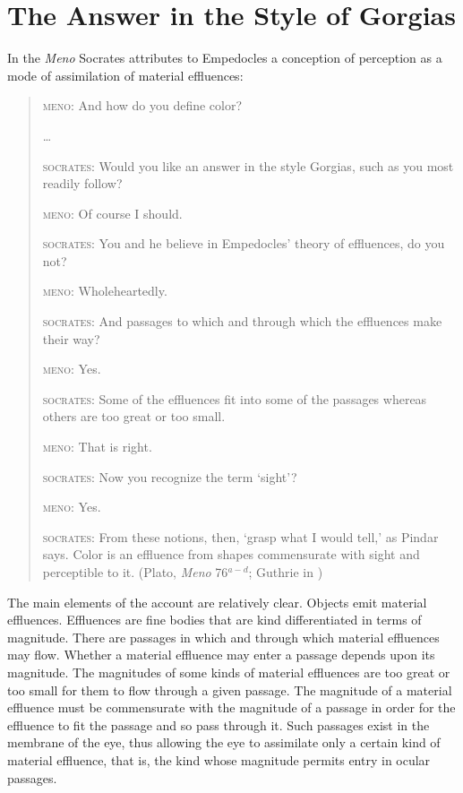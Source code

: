 \section{The Answer in the Style of Gorgias} %
\label{sec:the_answer_in_the_style_of_gorgias}

In the \emph{Meno} Socrates attributes to Empedocles a conception of perception as a mode of assimilation of material effluences:
\begin{quotation}
    \textsc{meno}: And how do you define color?
    
    \ldots
    
    \textsc{socrates}: Would you like an answer in the style Gorgias, such as you most readily follow?
    
    \textsc{meno}: Of course I should.
    
    \textsc{socrates}: You and he believe in Empedocles' theory of effluences, do you not?
    
    \textsc{meno}: Wholeheartedly.
    
    \textsc{socrates}: And passages to which and through which the effluences make their way?
    
    \textsc{meno}: Yes.
    
    \textsc{socrates}: Some of the effluences fit into some of the passages whereas others are too great or too small.
    
    \textsc{meno}: That is right.
    
    \textsc{socrates}: Now you recognize the term `sight'?
    
    \textsc{meno}: Yes.
    
    \textsc{socrates}: From these notions, then, `grasp what I would tell,' as Pindar says. Color is an effluence from shapes commensurate with sight and perceptible to it. (Plato, \emph{Meno} 76\( ^{a-d} \); Guthrie in \citealt[359]{Hamilton:1989fk})
\end{quotation}

The main elements of the account are relatively clear. Objects emit material effluences. Effluences are fine bodies that are kind differentiated in terms of magnitude. There are passages in which and through which material effluences may flow. Whether a material effluence may enter a passage depends upon its magnitude. The magnitudes of some kinds of material effluences are too great or too small for them to flow through a given passage. The magnitude of a material effluence must be commensurate with the magnitude of a passage in order for the effluence to fit the passage and so pass through it. Such passages exist in the membrane of the eye, thus allowing the eye to assimilate only a certain kind of material effluence, that is, the kind whose magnitude permits entry in ocular passages.


